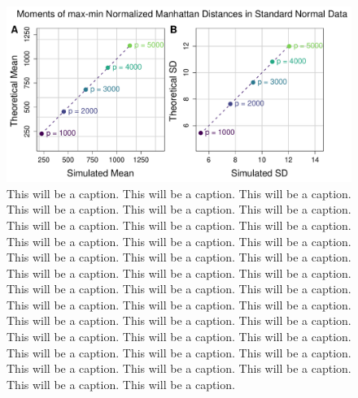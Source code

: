 \documentclass[10pt,letterpaper]{article}\usepackage[]{graphicx}\usepackage[]{color}
\begin{document}
\begin{figure}[H]
	\includegraphics[width=\textwidth]{compared_moments_normal_manhattan_max-min.pdf}
	\caption{This will be a caption. This will be a caption. This will be a caption. This will be a caption. This will be a caption. This will be a caption. This will be a caption. This will be a caption. This will be a caption. This will be a caption. This will be a caption. This will be a caption. This will be a caption. This will be a caption. This will be a caption. This will be a caption. This will be a caption. This will be a caption. This will be a caption. This will be a caption. This will be a caption. This will be a caption. This will be a caption. This will be a caption. This will be a caption. This will be a caption. This will be a caption. This will be a caption. This will be a caption. This will be a caption. This will be a caption. This will be a caption. This will be a caption. This will be a caption. This will be a caption. This will be a caption. This will be a caption. This will be a caption.}
\end{figure}
\end{document}
